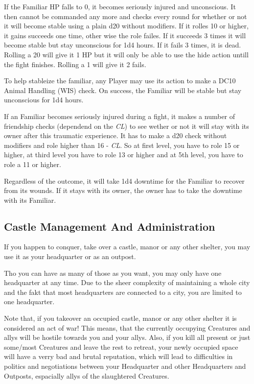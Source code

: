 \documentclass[10pt,twoside,twocolumn,openany]{book}
\begin{document}
If the Familiar HP falls to 0, it becomes seriously injured and unconscious. It then cannot be commanded any more and checks every round for whether or not it will become stable using a plain d20 without modifiers. If it rolles 10 or higher, it gains succeeds one time, other wise the role failes. If it succeeds 3 times it will become stable but stay unconscious for 1d4 hours. If it fails 3 times, it is dead. Rolling a 20 will give it 1 HP but it will only be able to use the hide action untill the fight finishes. Rolling a 1 will give it 2 fails.

To help stableize the familiar, any Player may use its action to make a DC10 Animal Handling (WIS) check. On success, the Familiar will be stable but stay unconscious for 1d4 hours.

If an Familiar becomes seriously injured during a fight, it makes a number of friendship checks (dependend on the \textit{CL}) to see wether or not it will stay with its owner after this traumatic experience. It has to make a d20 check without modifiers and role higher than 16 - \textit{CL}. So at first level, you have to role 15 or higher, at third level you have to role 13 or higher and at 5th level, you have to role a 11 or higher.

Regardless of the outcome, it will take 1d4 downtime for the Familiar to recover from its wounds. If it stays with its owner, the owner has to take the downtime with its Familiar.

\newpage

\subsection{Castle Management And Administration}

If you happen to conquer, take over a castle, manor or any other shelter, you may use it as your headquarter or as an outpost.

Tho you can have as many of those as you want, you may only have one headquarter at any time. Due to the sheer complexity of maintaining a whole city and the fakt that most headquarters are connected to a city, you are limited to one headquarter.

Note that, if you takeover an occupied castle, manor or any other shelter it is considered an act of war! This means, that the currently occupying Creatures and allys will be hostile towards you and your allys. Also, if you kill all present or just some/most Creatures and leave the rest to retreat, your newly occupied space will have a verry bad and brutal reputation, which will lead to difficulties in politics and negotiations between your Headquarter and other Headquarters and Outposts, espacially allys of the slaughtered Creatures.
\end{document}
